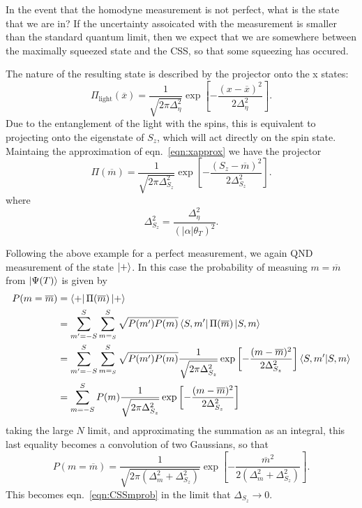 \documentclass{article}
\newcommand*\meas[1]{\overline{#1}}
\begin{document}
In the event that the homodyne measurement is not perfect, what is the state
that we are in? If the uncertainty assoicated with the measurement is smaller
than the standard quantum limit, then we expect that we are somewhere between
the maximally squeezed state and the CSS, so that some squeezing has
occured.

The nature of the resulting state is described by the
projector onto the x states:~\cite{Cox2016, Zhang2019}
%
\begin{equation}
  \Pi_\text{light}(\meas{x}) = \frac{1}{\sqrt{2\pi\Delta_\eta^2}}\exp\left[
    -\frac{(x-\meas{x})^2}{2\Delta_\eta^2}\right].
\end{equation}
%
Due to the entanglement of the light with the spins, this is equivalent to
projecting onto the eigenstate of $S_z$, which will act directly on the spin
state. Maintaing the approximation of
eqn.~\ref{eqn:xapprox}
we have the projector
%
\begin{equation}
  \Pi(\meas{m}) = \frac{1}{\sqrt{2\pi\Delta_{S_z}^2}}\exp\left[
    -\frac{(S_z-\meas{m})^2}{2\Delta_{S_z}^2}\right].
\end{equation}
%
where
%
\begin{equation}
  \Delta_{S_z}^2 = \frac{\Delta_\eta^2}{(|\alpha|\theta_T)^2}.
\end{equation}

Following the above example for a perfect measurement, we again QND measurement
of the state $\ket{+}$. In this case the probability of measuing $m=\meas{m}$
from $\ket{\Psi(T)}$ is given by~\cite{}
%
\begin{align}
  P(m=\meas{m}) &= \bra{+}\Pi(\meas{m})\ket{+}\\
  & = \sum_{m'=-S}^S \sum_{m=_S}^S \sqrt{P(m')P(m)}\bra{S,
  m'}\Pi(\meas{m})\ket{S, m} \\
  & = \sum_{m'=-S}^S \sum_{m=_S}^S \sqrt{P(m')P(m)}
  \frac{1}{\sqrt{2\pi\Delta_{S_z}^2}}\exp\left[-\frac{(m-\meas{m})^2}{2\Delta_{S_z}^2}\right] 
  \bra{S, m'}\ket{S, m} \\
  &= \sum_{m=-S}^{S} P(m) 
  \frac{1}{\sqrt{2\pi\Delta_{S_z}^2}}\exp\left[-\frac{(m-\meas{m})^2}{2\Delta_{S_z}^2}\right] 
\end{align}
%
taking the large $N$ limit, and approximating the summation as an integral,
this last equality becomes a convolution of two Gaussians, so that
%
\begin{equation}
  P(m=\meas{m}) = \frac{1}{\sqrt{2\pi(\Delta_m^2 + \Delta_{S_z}^2)}}\exp\left[
    -\frac{\meas{m}^2}{2(\Delta_m^2 + \Delta_{S_z}^2)}\right].
\end{equation}
%
This becomes eqn.~\ref{eqn:CSSmprob} in the limit that $\Delta_{S_z} \to 0$.
\end{document}
